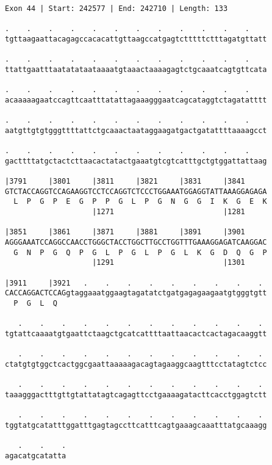 \documentclass{article}
\begin{document}
\newpage
\begin{Verbatim}
Exon 44 | Start: 242577 | End: 242710 | Length: 133
 
.    .    .    .    .    .    .    .    .    .    .    .    
tgttaagaattacagagccacacattgttaagccatgagtctttttctttagatgttatt
  
.    .    .    .    .    .    .    .    .    .    .    .    
ttattgaatttaatatataataaaatgtaaactaaaagagtctgcaaatcagtgttcata
  
.    .    .    .    .    .    .    .    .    .    .    .    
acaaaaagaatccagttcaatttatattagaaagggaatcagcataggtctagatatttt
  
.    .    .    .    .    .    .    .    .    .    .    .    
aatgttgtgtgggttttattctgcaaactaataggaagatgactgatattttaaaagcct
  
.    .    .    .    .    .    .    .    .    .    .    .    
gacttttatgctactcttaacactatactgaaatgtcgtcatttgctgtggattattaag
  
|3791     |3801     |3811     |3821     |3831     |3841     
GTCTACCAGGTCCAGAAGGTCCTCCAGGTCTCCCTGGAAATGGAGGTATTAAAGGAGAGA
  L  P  G  P  E  G  P  P  G  L  P  G  N  G  G  I  K  G  E  K
                    |1271                         |1281     
  
|3851     |3861     |3871     |3881     |3891     |3901     
AGGGAAATCCAGGCCAACCTGGGCTACCTGGCTTGCCTGGTTTGAAAGGAGATCAAGGAC
  G  N  P  G  Q  P  G  L  P  G  L  P  G  L  K  G  D  Q  G  P
                    |1291                         |1301     
  
|3911     |3921   .    .    .    .    .    .    .    .    . 
CACCAGGACTCCAGgtaggaaatggaagtagatatctgatgagagaagaatgtgggtgtt
  P  G  L  Q                                                
  
   .    .    .    .    .    .    .    .    .    .    .    . 
tgtattcaaaatgtgaattctaagctgcatcattttaattaacactcactagacaaggtt
  
   .    .    .    .    .    .    .    .    .    .    .    . 
ctatgtgtggctcactggcgaattaaaaagacagtagaaggcaagtttcctatagtctcc
  
   .    .    .    .    .    .    .    .    .    .    .    . 
taaagggactttgttgtattatagtcagagttcctgaaaagatacttcacctggagtctt
  
   .    .    .    .    .    .    .    .    .    .    .    . 
tggtatgcatatttggatttgagtagccttcatttcagtgaaagcaaatttatgcaaagg
  
   .    .    .
agacatgcatatta
\end{Verbatim}
\newpage
\end{document}
